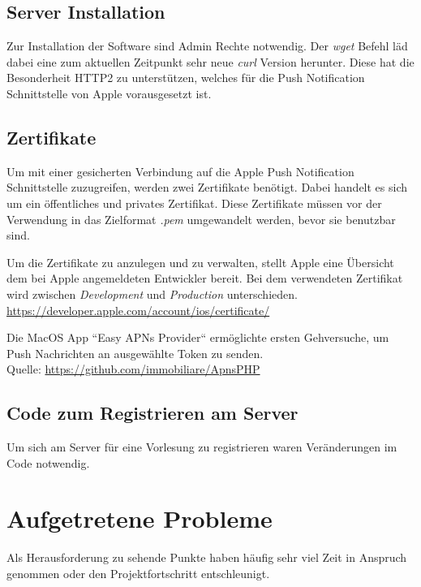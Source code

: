 \subsection{Server Installation}
Zur Installation der Software sind Admin Rechte notwendig. Der \textit{wget} Befehl läd dabei eine zum aktuellen Zeitpunkt sehr neue \textit{curl} Version herunter. Diese hat die Besonderheit HTTP2 zu unterstützen, welches für die Push Notification Schnittstelle von Apple vorausgesetzt ist.



\subsection{Zertifikate}
Um mit einer gesicherten Verbindung auf die Apple Push Notification Schnittstelle zuzugreifen, werden zwei Zertifikate benötigt. Dabei handelt es sich um ein öffentliches und privates Zertifikat. Diese Zertifikate müssen vor der Verwendung in das Zielformat \textit{.pem} umgewandelt werden, bevor sie benutzbar sind.

Um die Zertifikate zu anzulegen und zu verwalten, stellt Apple eine Übersicht dem bei Apple angemeldeten Entwickler bereit. Bei dem verwendeten Zertifikat wird zwischen \textit{Development} und \textit{Production} unterschieden.\\
\url{https://developer.apple.com/account/ios/certificate/}


Die MacOS App ``Easy APNs Provider`` ermöglichte ersten Gehversuche, um Push Nachrichten an ausgewählte Token zu senden.\\
Quelle: \url{https://github.com/immobiliare/ApnsPHP}



\subsection{Code zum Registrieren am Server}
Um sich am Server für eine Vorlesung zu registrieren waren Veränderungen im Code notwendig.



\section{Aufgetretene Probleme}
Als Herausforderung zu sehende Punkte haben häufig sehr viel Zeit in Anspruch genommen oder den Projektfortschritt entschleunigt.


